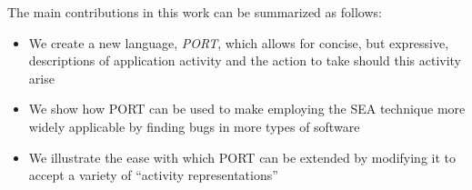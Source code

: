 The main contributions in this work can be summarized as follows:

\begin{itemize}

\item{We create a new language, {\em PORT},
  which allows for concise, but expressive, descriptions of
    application activity and the action to take should this activity arise}

\item{We show how PORT can be used to make employing the SEA technique
  more widely applicable by finding bugs in more types of software}

\item{We illustrate the ease with which PORT can be extended by modifying
  it to accept a variety of ``activity representations''}

\end{itemize}

